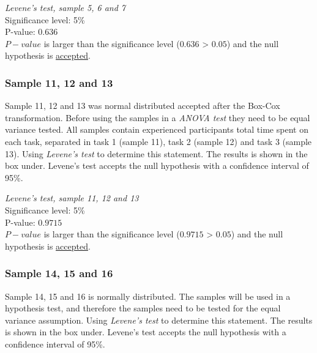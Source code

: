 \begin{center}
	\begin{tcolorbox}[box align=center,width=\textwidth-5cm]
		\centering
		\textit{Levene's test, sample 5, 6 and 7}\\
		Significance level: 5\%  \\[0.5cm]
		
		P-value: $0.636$\\[0.2cm]
		
		$P-value$ is larger than the significance level ($0.636$ > $0.05$) and the null hypothesis is \underline{accepted}.\\[0.5cm]
	\end{tcolorbox} 
\end{center}

\subsubsection{Sample 11, 12 and 13}\label{sec:sample11,12,13_levene}
Sample 11, 12 and 13 was normal distributed accepted after the Box-Cox transformation. Before using the samples in a \textit{ANOVA test} they need to be equal variance tested. All samples contain experienced participants total time spent on each task, separated in task 1 (sample 11), task 2 (sample 12) and task 3 (sample 13). Using \textit{Levene's test} to determine this statement. The results is shown in the box under. Levene's test accepts the null hypothesis with a confidence interval of 95\%.

 \begin{center}
	\begin{tcolorbox}[box align=center,width=\textwidth-5cm]
		\centering
		\textit{Levene's test, sample 11, 12 and 13}\\
		Significance level: 5\%  \\[0.5cm]
		
		P-value: $0.9715$\\[0.2cm]
		
		$P-value$ is larger than the significance level ($0.9715$ > $0.05$) and the null hypothesis is \underline{accepted}.\\[0.5cm]
	\end{tcolorbox} 
\end{center}

\subsubsection{Sample 14, 15 and 16}\label{sec:sample14,15,16_levene}
Sample 14, 15 and 16 is normally distributed. The samples will be used in a hypothesis test, and therefore the samples need to be tested for the equal variance assumption. Using \textit{Levene's test} to determine this statement. The results is shown in the box under. Levene's test accepts the null hypothesis with a confidence interval of 95\%.

